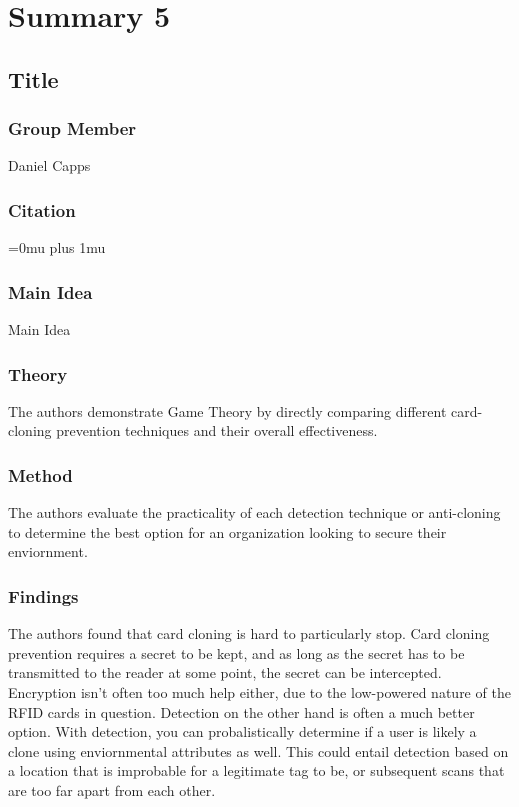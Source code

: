 \section{Summary 5}

\noindent
\subsection{Title}

\subsubsection{Group Member}

\noindent
Daniel Capps

\noindent
\subsubsection{Citation}

\Urlmuskip=0mu plus 1mu\relax

\subsubsection{Main Idea}

\noindent
Main Idea

\subsubsection{Theory}

\noindent
The authors demonstrate Game Theory by directly comparing different card-cloning prevention techniques and their overall effectiveness.

\subsubsection{Method}

\noindent
The authors evaluate the practicality of each detection technique or anti-cloning to determine the best option for an organization looking to secure their enviornment.

\subsubsection{Findings}

\noindent
The authors found that card cloning is hard to particularly stop.  Card cloning prevention requires a secret to be kept, and as long as the secret has to be transmitted to the reader at some point, the secret can be intercepted.  Encryption isn't often too much help either, due to the low-powered nature of the RFID cards in question.  Detection on the other hand is often a much better option.  With detection, you can probalistically determine if a user is likely a clone using enviornmental attributes as well.  This could entail detection based on a location that is improbable for a legitimate tag to be, or subsequent scans that are too far apart from each other.

